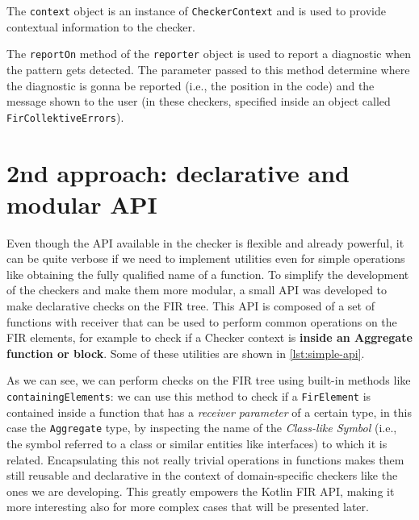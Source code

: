 \documentclass[12pt,a4paper,openright,twoside]{book}
\begin{document}


The \lstinline{context} object is an instance of \lstinline{CheckerContext} and is 
used to provide contextual information to the checker.

The \lstinline{reportOn} method of the \lstinline{reporter} object is used to
report a diagnostic when the pattern gets detected. The parameter passed to this
method determine where the diagnostic is gonna be reported (i.e., the position
in the code) and the message shown to the user (in these checkers, specified
inside an object called \lstinline{FirCollektiveErrors}).

\section{2nd approach: declarative and modular API}

Even though the API available in the checker is flexible and already powerful,
it can be quite verbose if we need to implement utilities even for simple
operations like obtaining the fully qualified name of a function. To simplify
the development of the checkers and make them more modular, a small API was
developed to make declarative checks on the \ac{FIR} tree. This API is composed
of a set of functions with receiver that can be used to perform common
operations on the \ac{FIR} elements, for example to check if a Checker context
is \textbf{inside an Aggregate function or block}. Some of these utilities are
shown in \cref{lst:simple-api}.



As we can see, we can perform checks on the \ac{FIR} tree using built-in methods
like \lstinline{containingElements}: we can use this method to check if a
\lstinline{FirElement} is contained inside a function that has a \emph{receiver
parameter} of a certain type, in this case the \lstinline{Aggregate} type, by
inspecting the name of the \emph{Class-like Symbol} (i.e., the symbol referred
to a class or similar entities like interfaces) to which it is related. 
%
Encapsulating this not really trivial operations in functions makes them still
reusable and declarative in the context of domain-specific checkers like the
ones we are developing. This greatly empowers the Kotlin \ac{FIR} API, making it
more interesting also for more complex cases that will be presented later.
\end{document}
